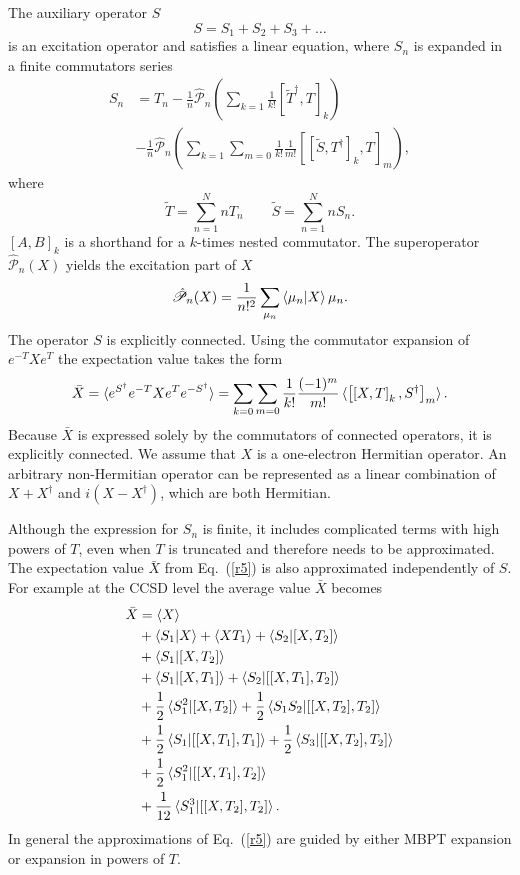 \documentclass[preprint,12pt]{elsarticle}
\newcommand{\cm}[2]{ [ #1,#2]}
\newcommand{\dg}[1]{#1^\dagger}
\newcommand{\dgg}{^\dagger}
\newcommand{\equ}[1]{\begin{equation} #1 \end{equation}}
\newcommand{\equl}[2]{\begin{equation}\label{#2} #1 \end{equation}}
\newcommand{\equal}[2]{\begin{align}\label{#2} #1 \end{align}}
\newcommand{\equsl}[2]{\begin{equation}\begin{split}\label{#2} #1 \end{split}\end{equation}}
\newcommand{\fr}[1]{Eq.~(\ref{#1})}
\newcommand{\esd}{e^{S^\dagger}}
\newcommand{\esdm}{e^{-S^\dagger}}
\newcommand{\etm}{e^{-T}}
\newcommand{\et}{e^{T}}
\begin{document}
The auxiliary operator $S$  
\equl{S = S_1 + S_2 + S_3 +\ldots
}{r4}
is an excitation operator and satisfies a linear equation, where $S_n$ is expanded
 in a finite commutators series\cite{jeziorski1993explicitly}
\equal{
S_n &= T_n  - \frac1n \hat{\mathscr{P}}_n \left ( \sum_{k=1}
\frac{1}{k!}\cm{\widetilde{T}\dgg}{T}_k \right ) \\
&- \frac1n \hat{\mathscr{P}}_n\left (\sum_{k=1}\sum_{m=0}
\frac{1}{k!}\frac{1}{m!} [\cm{\widetilde{S}}{\dg{T}}_k,T]_m\right)\nonumber,
}{ss}
where
 \equ{
\widetilde{T} = \sum_{n = 1}^{N} nT_n \qquad\widetilde{S} = \sum_{n = 1}^{N} nS_n.
}
 $[A, B]_k$ is a shorthand for a $k$-times nested commutator.
 The superoperator $\hat{\mathscr{P}}_n(X)$ 
yields the 
excitation part of $X$
\equl{\hat{\mathscr{P}}_n(X) = \frac{1}{n!^2}\sum_{\mu_n} \braket{\mu_n|X}\mu_n.}{superp}
The  operator $S$ is explicitly connected.\cite{jeziorski1993explicitly}
Using the commutator expansion of $\etm X\et$ the expectation value takes the form
\equl{ \bar{X} = \braket{\esd\etm X \et \esdm} = \sum_{k=0}\sum_{m=0}\frac{1}{k!}\frac{(-1)^m}{m!}\braket{\left[\left[X, T\right]_k,S^\dagger\right]_m}.
}{r5}
Because $\bar{X}$  is expressed solely by the commutators of connected operators, it is 
explicitly connected. We assume 
that $X$ is a one-electron Hermitian operator. An arbitrary non-Hermitian operator can be
represented as a linear combination of $X+X^\dagger$ and $i(X-X^\dagger)$, which are both Hermitian.

Although the expression for $S_n$ is finite, it includes complicated terms with high powers of $T$, even when $T$ is truncated
and therefore needs to be approximated. The expectation value $\bar{X}$ from \fr{r5} is also approximated independently of $S$.
For example at the CCSD level the average value $\bar{X}$ becomes\cite{korona2006one}
\equsl{\bar{X} &= \braket{X} \\
  &+ \braket{S_1|X} + \braket{XT_1} + \braket{S_2|[X, T_2]}\\
  &+\braket{S_1|[X, T_2]} \\
  &+ \braket{S_1|[X, T_1]} +\braket{S_2|[[X, T_1], T_2]} \\
  &+\frac12\braket{S_1^2|[X, T_2]} +\frac12\braket{S_1S_2|[[X, T_2], T_2]} \\
  &+ \frac12\braket{S_1|[[X, T_1], T_1]} +\frac12\braket{S_3|[[X, T_2], T_2]} \\
  &+ \frac12\braket{S_1^2|[[X, T_1], T_2]} \\
  &+\frac{1}{12}\braket{S_1^3|[[X, T_2], T_2]}.
}{x-ccsd}
In general the approximations of \fr{r5} are guided by either MBPT expansion or expansion in powers of $T$.
\end{document}
